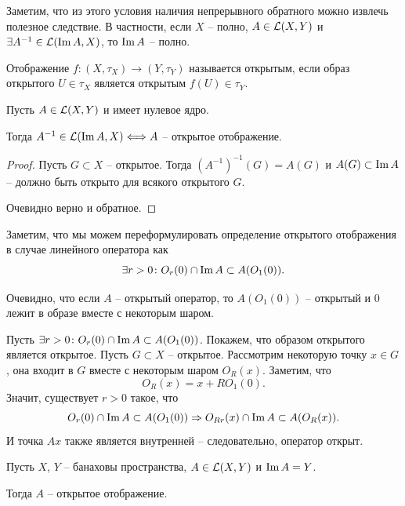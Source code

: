 \begin{note}
    Заметим, что из этого условия наличия непрерывного обратного можно извлечь полезное следствие.
    В частности, если $X$ -- полно, $A \in \mathcal{L}(X, Y)$ и $\exists A^{-1} \in \mathcal{L}(\operatorname{Im} A, X)$, то $\operatorname{Im} A$ -- полно.
\end{note}
\begin{definition}
    Отображение $f\colon (X, \tau_X) \to (Y, \tau_Y)$ называется открытым, если образ открытого $U \in \tau_X$ является открытым $f(U) \in \tau_Y$.
\end{definition}
\begin{proposition}
    Пусть $A \in \mathcal{L}(X, Y)$ и имеет нулевое ядро.

    Тогда $A^{-1} \in \mathcal{L}(\operatorname{Im} A, X) \Longleftrightarrow A$ -- открытое отображение.
\end{proposition}
\begin{proof}
    Пусть $G \subset X$ -- открытое.
    Тогда $(A^{-1})^{-1}(G) = A(G)$ и $A(G) \subset \operatorname{Im} A$ -- должно быть открыто для всякого открытого $G$.

    Очевидно верно и обратное.
\end{proof}
\begin{note}
    Заметим, что мы можем переформулировать определение открытого отображения в случае линейного оператора как
    \[
        \exists r > 0\colon O_r(0) \cap \operatorname{Im} A \subset A(O_1(0)).
    \]

    Очевидно, что если $A$ -- открытый оператор, то $A(O_1(0))$ -- открытый и $0$ лежит в образе вместе с некоторым шаром.

    Пусть $\exists r > 0 \colon O_r(0) \cap \operatorname{Im} A \subset A(O_1(0))$.
    Покажем, что образом открытого является открытое.
    Пусть $G \subset X$ -- открытое.
    Рассмотрим некоторую точку $x \in G$, она входит в $G$ вместе с некоторым шаром $O_R(x)$.
    Заметим, что
    \[
        O_R(x) = x + RO_1(0).
    \]
    Значит, существует $r > 0$ такое, что
    \[
        O_r(0) \cap \operatorname{Im} A \subset A(O_1(0)) \Rightarrow O_{Rr}(x) \cap \operatorname{Im} A \subset A(O_R(x)).
    \]
    И точка $Ax$ также является внутренней -- следовательно, оператор открыт.
\end{note}
\begin{theorem}
    Пусть $X$, $Y$ -- банаховы пространства, $A \in \mathcal{L}(X, Y)$ и $\operatorname{Im} A = Y$.

    Тогда $A$ -- открытое отображение.
\end{theorem}

